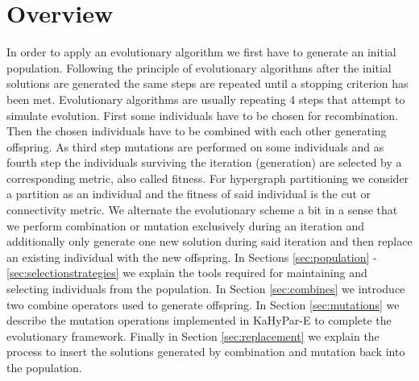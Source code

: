 \documentclass[a4paper,12pt,titlepage, BCOR7mm,headsepline]{scrbook}
\numberwithin{equation}{section}
\begin{document}
\section{Overview}
In order to apply an evolutionary algorithm we first have to generate an initial population. 
Following the principle of evolutionary algorithms after the initial solutions are generated  the same steps are repeated until a stopping criterion has been met.
Evolutionary algorithms are usually repeating 4 steps that attempt to simulate evolution. First some individuals have to be chosen for recombination. Then the chosen individuals have to be combined with each other generating offspring. As third step mutations are performed on some individuals and as fourth step the individuals surviving the iteration (generation) are selected by a corresponding metric, also called fitness. For hypergraph partitioning we consider a partition as an individual and the fitness of said individual is the cut or connectivity metric. We alternate the evolutionary scheme a bit in a sense that we perform combination or mutation exclusively during an iteration and additionally only generate one new solution during said iteration and then replace an existing individual with the new offspring. 
In Sections \ref{sec:population} - \ref{sec:selectionstrategies} we explain the tools required for maintaining and selecting individuals from the population. %
In Section \ref{sec:combines} we introduce two combine operators used to generate offspring. In Section \ref{sec:mutations} we describe the mutation operations implemented in KaHyPar-E to complete the evolutionary framework. Finally in Section \ref{sec:replacement} we explain the process to insert the solutions generated by combination and mutation back into the population.
\end{document}
